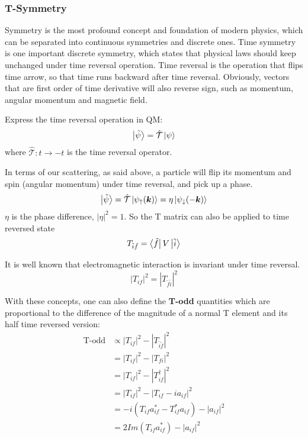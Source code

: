 \subsubsection{T-Symmetry}
Symmetry is the most profound concept and foundation of modern physics, which
can be separated into continuous symmetries and discrete ones. Time symmetry
is one important discrete symmetry, which states that physical laws should
keep unchanged under time reversal operation. Time reversal is the operation
that flips time arrow, so that time runs backward after time reversal. Obviously, 
vectors that are first order of time derivative will also reverse sign, such
as momentum, angular momentum and magnetic field.

Express the time reversal operation in QM:
\begin{equation}
    \ket{\tilde{\psi}} = \hat{\mathcal{T}} \ket{\psi} 
\end{equation}
where $\hat{\mathcal{T}}: t \rightarrow -t$ is the time reversal operator. 

In terms of our scattering, as said above, a particle will flip its momentum 
and spin (angular momentum) under time reversal, and pick up a phase.
\begin{equation}
    \ket{\tilde{\psi}} = \hat{\mathcal{T}} \ket{\psi_\uparrow(\boldsymbol{k})} = \eta\ket{\psi_\downarrow(-\boldsymbol{k})}
\end{equation}
$\eta$ is the phase difference, $|\eta|^2 = 1$. So the T matrix can also be applied
to time reversed state
\begin{equation}
    T_{\tilde{i}\tilde{f}} = \bra{\tilde{f}} V \ket{\tilde{i}}
\end{equation}

It is well known that electromagnetic interaction is invariant under time reversal.
\begin{equation}
    |T_{if}|^2 = |T_{\tilde{f}\tilde{i}}|^2 
\end{equation}

With these concepts, one can also define the \textbf{T-odd} quantities which
are proportional to the difference of the magnitude of a normal T element and 
its half time reversed version:
\begin{equation}
    \begin{aligned}
	\text{T-odd} &\propto |T_{if}|^2 - |T_{\tilde{i}\tilde{f}}|^2	\\
	    &= |T_{if}|^2 - |T_{fi}|^2	\\
	    &= |T_{if}|^2 - |T^\dag_{if}|^2	\\
	    &= |T_{if}|^2 - |T_{if} - ia_{if}|^2	\\
	    &= -i(T_{if}a^*_{if} - T^*_{if}a_{if}) - |a_{if}|^2	\\
	    &= 2Im(T_{if}a^*_{if}) - |a_{if}|^2
    \end{aligned}
    \label{eq:T-odd}
\end{equation}

